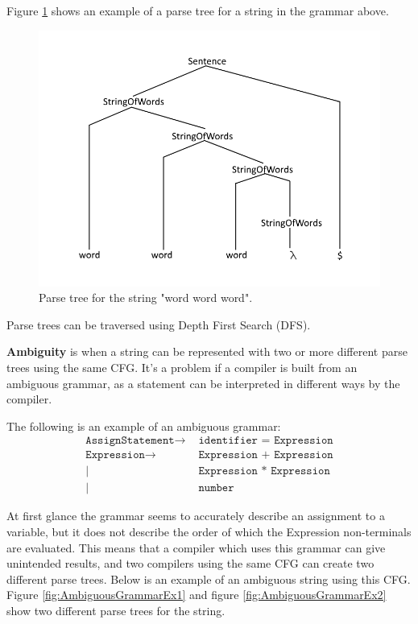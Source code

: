 Figure \ref{fig:ParseTreeEx} shows an example of a parse tree for a string in the grammar above.

\begin{figure}[H]
	\centering
	\includegraphics[width=\textwidth/2+\textwidth/4]{3.Theory/images/ParseTree.png}
	\caption{
		Parse tree for the string "word word word".
	}
	\label{fig:ParseTreeEx}
\end{figure}

Parse trees can be traversed using Depth First Search (DFS).

\textbf{Ambiguity} is when a string can be represented with two or more different parse trees using the same CFG.
It's a problem if a compiler is built from an ambiguous grammar, as a statement can be interpreted in different ways by the compiler.

The following is an example of an ambiguous grammar:
\begin{align*}
	\texttt{AssignStatement}\to & \texttt{ identifier = Expression} \\
	\texttt{Expression}\to      & \texttt{ Expression + Expression} \\
	|                           & \texttt{ Expression * Expression} \\
	|                           & \texttt{ number}
\end{align*}

At first glance the grammar seems to accurately describe an assignment to a variable, but it does not describe the order of which the Expression non-terminals are evaluated.
This means that a compiler which uses this grammar can give unintended results, and two compilers using the same CFG can create two different parse trees.
Below is an example of an ambiguous string using this CFG.
Figure \ref{fig:AmbiguousGrammarEx1} and figure \ref{fig:AmbiguousGrammarEx2} show two different parse trees for the string.

